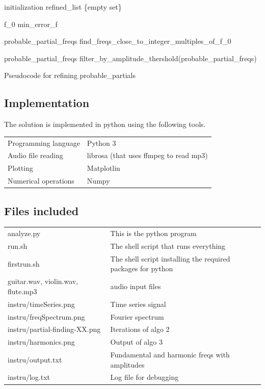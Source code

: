 \documentclass{article}
\begin{document}
\begin{algorithm}[H]
 initialization\;
    refined\_list \gets \{empty set\}\;
    
  
  f_0 \gets min\_error\_f \;
  
  probable\_partial\_freqs \gets find\_freqs\_close\_to\_integer\_multiples\_of\_f_0 \;
  
  probable\_partial\_freqs \gets filter\_by\_amplitude\_thershold(probable\_partial\_freqs) \;
  
\caption{Pseudocode for refining probable\_partials}
\end{algorithm}

\subsection{Implementation}

The solution is implemented in python using the following tools.\\
\begin{tabular}{l l}
    Programming language & Python 3 \\
    Audio file reading & librosa (that uses ffmpeg to read mp3) \\
    Plotting & Matplotlin \cite{matplotlib} \\
    Numerical operations & Numpy \cite{numpy}
\end{tabular}

\subsection{Files included}
\begin{tabular}{|l|l|}
\hline
analyze.py & This is the python program  \\
run.sh     & The shell script that runs everything \\
firstrun.sh & The shell script installing the required packages for python \\
guitar.wav, violin.wav, flute.mp3 & audio input files\\
instru/timeSeries.png & Time series signal\\
instru/freqSpectrum.png & Fourier spectrum \\
instru/partial-finding-XX.png & Iterations of algo 2\\
instru/harmonics.png & Output of algo 3\\
instru/output.txt & Fundamental and harmonic freqs with amplitudes\\
instru/log.txt & Log file for debugging\\
\hline
\end{tabular}
\end{document}
